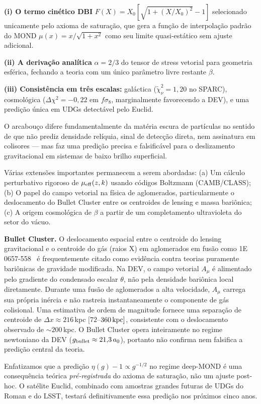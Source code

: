 \documentclass[aps,prd,twocolumn,showpacs,superscriptaddress]{revtex4-2}
\newcommand{\aO}{a_0}
\newcommand{\Xzero}{X_0}
\newcommand{\mueff}{\mu_{\rm eff}}
\begin{document}
\textbf{(i) O termo cinético DBI} $F(X) = \Xzero[\sqrt{1+(X/\Xzero)^2}-1]$
selecionado unicamente pelo axioma de saturação, que gera a
função de interpolação padrão do MOND $\mu(x) = x/\sqrt{1+x^2}$
como seu limite quasi-estático sem ajuste adicional.

\textbf{(ii) A derivação analítica} $\alpha = 2/3$ do tensor de
stress vetorial para geometria esférica, fechando a teoria com
um único parâmetro livre restante $\beta$.

\textbf{(iii) Consistência em três escalas:}
galáctica ($\widetilde\chi^2_\nu = 1{,}20$ no SPARC),
cosmológica ($\Delta\chi^2 = -0{,}22$ em $f\sigma_8$,
marginalmente favorecendo a DEV), e uma predição única em
UDGs detectável pelo Euclid.

O arcabouço difere fundamentalmente da matéria escura de
partículas no sentido de que não prediz densidade relíquia,
sinal de detecção direta, nem assinatura em colisores — mas
faz uma predição precisa e falsificável para o deslizamento
gravitacional em sistemas de baixo brilho superficial.

Várias extensões importantes permanecem a serem abordadas:
(a) Um cálculo perturbativo rigoroso de $\mueff(z,k)$ usando
    códigos Boltzmann (CAMB/CLASS);
(b) O papel do campo vetorial na física de aglomerados,
    particularmente o deslocamento do Bullet Cluster entre
    os centroides de lensing e massa bariônica;
(c) A origem cosmológica de $\beta$ a partir de um completamento
    ultravioleta do setor do vácuo.

\textbf{Bullet Cluster.}
O deslocamento espacial entre o centroide do lensing gravitacional
e o centroide do gás (raios X) em aglomerados em fusão como
1E\,0657-558~\cite{Clowe2006} é frequentemente citado como
evidência contra teorias puramente bariônicas de gravidade
modificada.
Na DEV, o campo vetorial $A_\mu$ é alimentado pelo gradiente do
condensado escalar $\theta$, não pela densidade bariônica local
diretamente.
Durante uma fusão de aglomerados a alta velocidade, $A_\mu$
carrega sua própria inércia e não rastreia instantaneamente o
componente de gás colisional.
Uma estimativa de ordem de magnitude fornece uma separação
de centroide de $\Delta x \approx 216$\,kpc
$[72$--$360\,{\rm kpc}]$, consistente com o deslocamento
observado de ${\sim}200$\,kpc.
O Bullet Cluster opera inteiramente no regime newtoniano da DEV
($g_{\rm bullet} \approx 21{,}3\,\aO$), portanto não confirma
nem falsifica a predição central da teoria.

Enfatizamos que a predição $\eta(g) - 1 \propto g^{-1/2}$ no
regime deep-MOND é uma consequência teórica \emph{pré-registrada}
do axioma de saturação, não um ajuste post-hoc.
O satélite Euclid, combinado com amostras grandes futuras de UDGs
do Roman e do LSST, testará definitivamente essa predição nos
próximos cinco anos.
\end{document}

